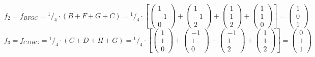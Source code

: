 \documentclass{article}
\newcommand*\rfrac[2]{{}^{#1}\!/_{#2}}%
\begin{document}
\[f_2=f_{BFGC}=\rfrac{1}{4}\cdot(B+F+G+C)=\rfrac{1}{4}\cdot\left[
\left({\begin{array}{c} 1 \\  -1 \\ 0 \end{array}}\right)+
\left({\begin{array}{c} 1 \\  -1 \\ 2 \end{array}}\right)+
\left({\begin{array}{c} 1 \\  1 \\ 2 \end{array}}\right)+
\left({\begin{array}{c} 1 \\  1 \\ 0 \end{array}}\right)\right]=
\left({\begin{array}{c} 1 \\ 0 \\ 1 \end{array}}\right)
\]
\[f_3=f_{CDHG}=\rfrac{1}{4}\cdot(C+D+H+G)=\rfrac{1}{4}\cdot\left[
\left({\begin{array}{c} 1 \\  1 \\ 0 \end{array}}\right)+
\left({\begin{array}{c} -1 \\  1 \\ 0 \end{array}}\right)+
\left({\begin{array}{c} -1 \\  1 \\ 2 \end{array}}\right)+
\left({\begin{array}{c} 1 \\  1 \\ 2 \end{array}}\right)\right]=
\left({\begin{array}{c} 0 \\ 1 \\ 1 \end{array}}\right)
\]
\end{document}
